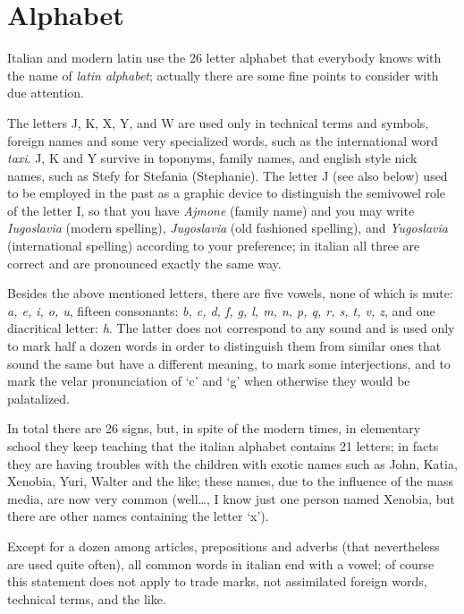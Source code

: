 \documentclass{ltugboat}
\newenvironment{comment}{\begingroup\setbox0\vbox\bgroup}{\egroup\endgroup}
\begin{document}
\section{Alphabet}
Italian  and  modern  latin  use the 26 letter alphabet that everybody knows
with the name of {\it latin alphabet\/}; actually there are some fine points
to consider with due attention.

  The  letters  J, K, X, Y, and W are used only in
technical terms and symbols, foreign names and some very specialized  words,
such  as  the international word {\it taxi}. J, K and Y survive in toponyms,
family names, and english style nick  names,  such  as  Stefy  for  Stefania
(Stephanie).  The  letter J (see also below) used to be employed in the past
as a graphic device to distinguish the semivowel role of the  letter  I,  so
that  you have {\it Ajmone} (family name) and you may write {\it Iugoslavia}
(modern spelling), {\it  Jugoslavia}  (old  fashioned  spelling),  and  {\it
Yugoslavia}  (international  spelling)  according  to  your  preference;  in
italian all three are correct and are pronounced exactly the same way.

Besides the above mentioned letters, there are five vowels, none of which is
mute: {\it a, e, i, o, u}, fifteen consonants: {\it b, c, d, f, g, l, m,  n,
p,  q,  r, s, t, v, z}, and one diacritical letter: {\it h}. The latter does
not correspond to any sound and is used only to mark half a dozen  words  in
order  to  distinguish them from similar ones that sound the same but have a
different meaning, to  mark  some  interjections,  and  to  mark  the  velar
pronunciation  of  `c'  and `g' when otherwise they would be palatalized. 

\begin{comment}
In  total  there  are  26  signs,  but,  in  spite  of  the modern times, in
elementary school they keep teaching that the italian alphabet  contains  21
letters;  in  facts  they  are having troubles with the children with exotic
names such as John, Katia, Xenobia, Yuri, Walter and the like; these  names,
due  to  the  influence of the mass media, are now very common (well\dots, I
know just one person named Xenobia, but there are other names containing the
letter `x').
\end{comment}

Except    for  a  dozen  among  articles,  prepositions  and  adverbs  (that
nevertheless are used quite often), all common words in italian end  with  a
vowel;  of  course  this  statement  does  not  apply  to  trade  marks, not
assimilated foreign words, technical terms, and the like.
\end{document}
